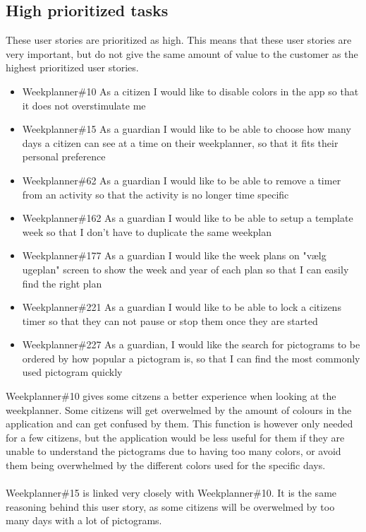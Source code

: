 \subsection{High prioritized tasks}
These user stories are prioritized as high. 
This means that these user stories are very important, but do not give the same amount of value to the customer as the highest prioritized user stories.
\begin{itemize}
    \item Weekplanner\#10 As a citizen I would like to disable colors in the app so that it does not overstimulate me
    \item Weekplanner\#15 As a guardian I would like to be able to choose how many days a citizen can see at a time on their weekplanner, so that it fits their personal preference 
    \item Weekplanner\#62 As a guardian I would like to be able to remove a timer from an activity so that the activity is no longer time specific
    \item Weekplanner\#162 As a guardian I would like to be able to setup a template week so that I don't have to duplicate the same weekplan  
    \item Weekplanner\#177 As a guardian I would like the week plans on "vælg ugeplan" screen to show the week and year of each plan so that I can easily find the right plan 
    \item Weekplanner\#221 As a guardian I would like to be able to lock a citizens timer so that they can not pause or stop them once they are started
    \item Weekplanner\#227 As a guardian, I would like the search for pictograms to be ordered by how popular a pictogram is, so that I can find the most commonly used pictogram quickly
\end{itemize}
\noindent
Weekplanner\#10 gives some citzens a better experience when looking at the weekplanner. 
Some citizens will get overwelmed by the amount of colours in the application and can get confused by them. 
This function is however only needed for a few citizens, but the application would be less useful for them if they are unable to understand the pictograms due to having too many colors, or avoid them being overwhelmed by the different colors used for the specific days.
\\\\
Weekplanner\#15 is linked very closely with Weekplanner\#10. 
It is the same reasoning behind this user story, as some citizens will be overwelmed by too many days with a lot of pictograms. 
